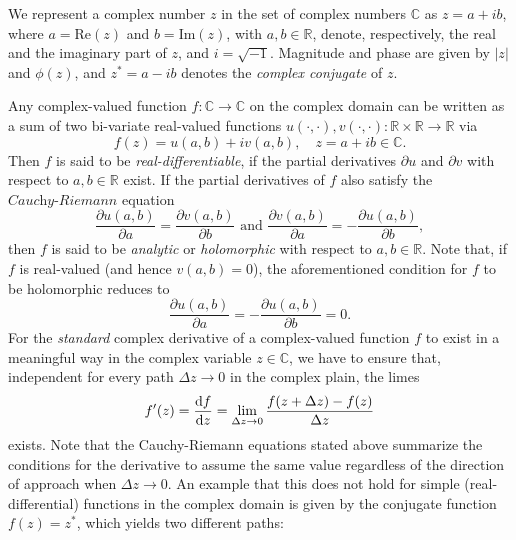 \documentclass[11pt]{article}
\begin{document}
We represent a complex number $z$ in the set of complex numbers $\mathbb  C$ as $z=a+ib$, where $a=\text{Re}(z)$ and $b=\text{Im}(z)$, with $a, b\in \mathbb R$, denote, respectively,  the real and the imaginary part of $z$, and $i=\sqrt{-1}$. %
Magnitude and phase are given by $|z|$ and $\phi(z)$, and $z^*=a-ib$ denotes the \textit{complex conjugate} of $z$.

Any complex-valued function $f\colon \mathbb C\to\mathbb C$ on the complex domain can be written as a sum of two bi-variate real-valued functions $u(\cdot, \cdot), v(\cdot,\cdot)\colon \mathbb R\times\mathbb R\to \mathbb R$ via
\begin{equation}
f(z) = u(a, b) + iv(a,b), \quad z=a+ib\in \mathbb C.
\end{equation}
Then $f$ is said to be \textit{real-differentiable}, if the partial derivatives $\partial u$ and $\partial v$ with respect to $a, b\in\mathbb R$ exist. If the partial derivatives of $f$ also satisfy the $\textit{Cauchy-Riemann}$ equation
\begin{equation}
\frac{\partial u(a,b)}{\partial a} = \frac{\partial v(a,b)}{\partial b}\text{  and  }\frac{\partial v(a,b)}{\partial a} = - \frac{\partial u(a,b)}{\partial b},
\end{equation}
then $f$ is said to be \textit{analytic} or \textit{holomorphic} with respect to $a,b\in \mathbb R$. Note that, if $f$ is real-valued (and hence $v(a,b)=0$), the aforementioned condition for $f$ to be holomorphic reduces to
\begin{equation}
\frac{\partial u(a,b)}{\partial a}=-\frac{\partial u(a,b)}{\partial b} = 0.
\end{equation}
For the \textit{standard} complex derivative of a complex-valued function $f$ to exist in a meaningful way in the complex variable $z\in \mathbb C$, we have to ensure that, independent for every path $\Delta z\to 0$ in the complex plain, the limes
\begin{equation}
f^\prime(z)  = \frac{\text d f}{\text d z}= \lim_{\Delta z\to 0} \frac{f(z+\Delta z) - f(z)}{\Delta z}
\end{equation}
exists.
Note that the Cauchy-Riemann equations stated above summarize the conditions for the derivative to assume the same value regardless of the direction of approach when $\Delta z\to 0$. An example that this does not hold for simple (real-differential) functions in the complex domain is given by the conjugate function $f(z) = z^*$, which yields two different paths:
\end{document}
